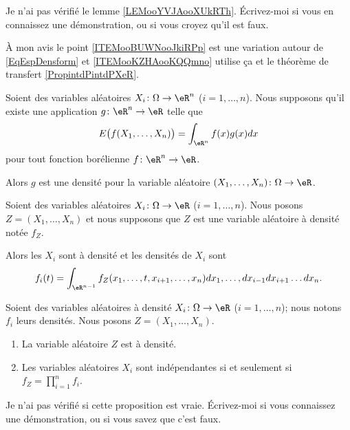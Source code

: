 \begin{probleme}
	Je n'ai pas vérifié le lemme \ref{LEMooYVJAooXUkRTh}. Écrivez-moi si vous en connaissez une démonstration, ou si vous croyez qu'il est faux.

	À mon avis le point \ref{ITEMooBUWNooJkiRPp} est une variation autour de \eqref{EqEspDensform} et \ref{ITEMooKZHAooKQQmno} utilise ça et le théorème de transfert \ref{PropintdPintdPXeR}.
\end{probleme}

\begin{lemma}       \label{LEMooAVTFooIQRvop}
	Soient des variables aléatoires \( X_i\colon \Omega\to \eR^n\) (\( i=1,\ldots, n\)). Nous supposons qu'il existe une application \( g\colon \eR^n\to \eR\) telle que
	\begin{equation}
		E\big( f(X_1,\ldots, X_n) \big)=\int_{\eR^n}f(x)g(x)dx
	\end{equation}
	pour tout fonction borélienne \( f\colon \eR^n\to \eR\).

	Alors \( g\) est une densité pour la variable aléatoire \( (X_1,\ldots, X_n)\colon \Omega\to \eR\).
\end{lemma}

\begin{proposition}       \label{PROPooNYNUooTCJgpl}
	Soient des variables aléatoires \( X_i\colon \Omega\to \eR\) (\( i=1,\ldots, n\)). Nous posons \( Z=(X_1,\ldots, X_n)\) et nous supposons que \( Z\) est une variable aléatoire à densité notée \( f_Z\).

	Alors les \( X_i\) sont à densité et les densités de \( X_i\) sont
	\begin{equation}
		f_i(t)=\int_{\eR^{n-1}}f_Z(x_1,\ldots, t, x_{i+1},\ldots, x_n)dx_1,\ldots, dx_{i-1}dx_{i+1}\ldots dx_n.
	\end{equation}
\end{proposition}

\begin{proposition}     \label{PROPooVUTLooDPdhxK}
	Soient des variables aléatoires à densité \( X_i\colon \Omega\to \eR\) (\( i=1,\ldots, n\)); nous notons \( f_i\) leurs densités. Nous posons \( Z=(X_1,\ldots, X_n)\).
	\begin{enumerate}
		\item
		      La variable aléatoire \( Z\) est à densité.
		\item   \label{ITEMooUQEFooAAFXJY}
		      Les variables aléatoires \( X_i\) sont indépendantes si et seulement si \( f_Z=\prod_{i=1}^n f_i\).
	\end{enumerate}
	\begin{probleme}
		Je n'ai pas vérifié si cette proposition est vraie. Écrivez-moi si vous connaissez une démonstration, ou si vous savez que c'est faux.
	\end{probleme}
\end{proposition}

